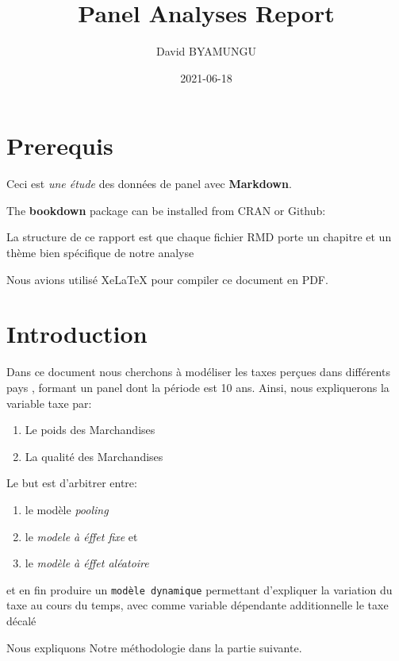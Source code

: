 \documentclass[
]{book}
\title{Panel Analyses Report}
\author{David BYAMUNGU}
\date{2021-06-18}
\providecommand{\tightlist}{%
  \setlength{\itemsep}{0pt}\setlength{\parskip}{0pt}}
\begin{document}
\maketitle

{
\setcounter{tocdepth}{1}
\tableofcontents
}
\hypertarget{prerequis}{%
\chapter{Prerequis}\label{prerequis}}

Ceci est \emph{une étude} des données de panel avec \textbf{Markdown}.

The \textbf{bookdown} package can be installed from CRAN or Github:

La structure de ce rapport est que chaque fichier RMD porte un chapitre et un thème bien spécifique de notre analyse

Nous avions utilisé XeLaTeX pour compiler ce document en PDF.

\hypertarget{intro}{%
\chapter{Introduction}\label{intro}}

Dans ce document nous cherchons à modéliser les taxes perçues dans différents pays , formant un panel dont la période est 10 ans.
Ainsi, nous expliquerons la variable taxe par:

\begin{enumerate}
\def\labelenumi{(\arabic{enumi})}
\tightlist
\item
  Le poids des Marchandises
\item
  La qualité des Marchandises
\end{enumerate}

Le but est d'arbitrer entre:

\begin{enumerate}
\def\labelenumi{(\arabic{enumi})}
\tightlist
\item
  le modèle \emph{pooling}
\item
  le \emph{modele à éffet fixe} et
\item
  le \emph{modèle à éffet aléatoire}
\end{enumerate}

et en fin produire un \texttt{modèle\ dynamique} permettant d'expliquer la variation du taxe au cours du temps, avec comme variable dépendante additionnelle le taxe décalé

Nous expliquons Notre méthodologie dans la partie suivante.
\end{document}
